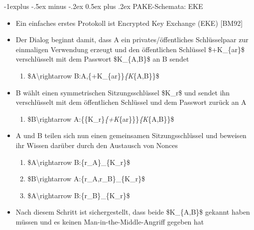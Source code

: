 \documentclass[a4paper]{article}
\makeatletter
\renewcommand{\subsection}{\@startsection{subsection}{2}{0mm}%
 {-1explus -.5ex minus -.2ex}%
 {0.5ex plus .2ex}%
 {\normalfont\normalsize\bfseries}}
\makeatother
\begin{document}
\begin{multicols}{3}
    \subsection{PAKE-Schemata: EKE}

    \begin{itemize}
        \item
              Ein einfaches erstes Protokoll ist Encrypted Key Exchange (EKE)
              {[}BM92{]}
        \item
              Der Dialog beginnt damit, dass A ein privates/öffentliches
              Schlüsselpaar zur einmaligen Verwendung erzeugt und den öffentlichen
              Schlüssel \$+K\_\{ar\}\$ verschlüsselt mit dem Passwort \$K\_\{A,B\}\$
              an B sendet

              \begin{enumerate}
                  \def\labelenumi{\arabic{enumi}.}
                  \item
                        \$A\textbackslash rightarrow B:A,\{+K\_\{ar\}\}\emph{\{K}\{A,B\}\}\$
              \end{enumerate}
        \item
              B wählt einen symmetrischen Sitzungsschlüssel \$K\_r\$ und sendet ihn
              verschlüsselt mit dem öffentlichen Schlüssel und dem Passwort zurück
              an A

              \begin{enumerate}
                  \def\labelenumi{\arabic{enumi}.}
                  \item
                        \$B\textbackslash rightarrow
                        A:\{\{K\_r\}\emph{\{+K}\{ar\}\}\}\emph{\{K}\{A,B\}\}\$
              \end{enumerate}
        \item
              A und B teilen sich nun einen gemeinsamen Sitzungsschlüssel und
              beweisen ihr Wissen darüber durch den Austausch von Nonces

              \begin{enumerate}
                  \def\labelenumi{\arabic{enumi}.}
                  \item
                        \$A\textbackslash rightarrow B:\{r\_A\}\_\{K\_r\}\$
                  \item
                        \$B\textbackslash rightarrow A:\{r\_A,r\_B\}\_\{K\_r\}\$
                  \item
                        \$A\textbackslash rightarrow B:\{r\_B\}\_\{K\_r\}\$
              \end{enumerate}
        \item
              Nach diesem Schritt ist sichergestellt, dass beide \$K\_\{A,B\}\$
              gekannt haben müssen und es keinen Man-in-the-Middle-Angriff gegeben
              hat
    \end{itemize}



\end{multicols}
\end{document}
